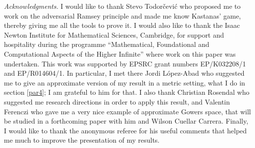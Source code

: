 \documentclass[a4paper,11pt]{article}
\theoremstyle{definition}
\numberwithin{equation}{section}
\begin{document}
\bigskip
\footnotesize
\noindent\textit{Acknowledgments.}
I would like to thank Stevo Todor\v{c}evi\'c who proposed me to work on the adversarial Ramsey principle and made me know Kastanas' game, thereby giving me all the tools to prove it. I would also like to thank the Isaac Newton Institute for Mathematical Sciences, Cambridge, for support and hospitality during the programme ``Mathematical, Foundational and Computational Aspects of the Higher Infinite'' where work on this paper was undertaken. This work was supported by EPSRC grant numbers EP/K032208/1 and EP/R014604/1. In particular, I met there Jordi L\'opez-Abad who suggested me to give an approximate version of my result in a metric setting, what I do in section \ref{par4}; I am grateful to him for that. I also thank Christian Rosendal who suggested me research directions in order to apply this result, and Valentin Ferenczi who gave me a very nice example of approximate Gowers space, that will be studied in a forthcoming paper with him and Wilson Cuellar Carrera. Finally, I would like to thank the anonymous referee for his useful comments that helped me much to improve the presentation of my results.
\end{document}
